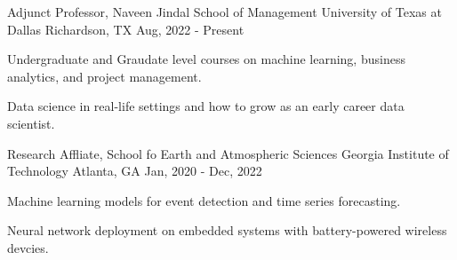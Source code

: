 

\begin{cventries}

\cventry
{Adjunct Professor, Naveen Jindal School of Management} %
{University of Texas at Dallas} %
{Richardson, TX} %
{Aug, 2022 - Present} %
{
	\begin{cvitems} %
		\item {Undergraduate and Graudate level courses on machine learning, business analytics, and project management.}
		\item {Data science in real-life settings and how to grow as an early career data scientist.}
	\end{cvitems}
}

\cventry
{Research Affliate, School fo Earth and Atmospheric Sciences} %
{Georgia Institute of Technology} %
{Atlanta, GA} %
{Jan, 2020 - Dec, 2022} %
{
	\begin{cvitems} %
		\item {Machine learning models for event detection and time series forecasting.}
		\item {Neural network deployment on embedded systems with battery-powered wireless devcies.}
	\end{cvitems}
}

%

\end{cventries}
